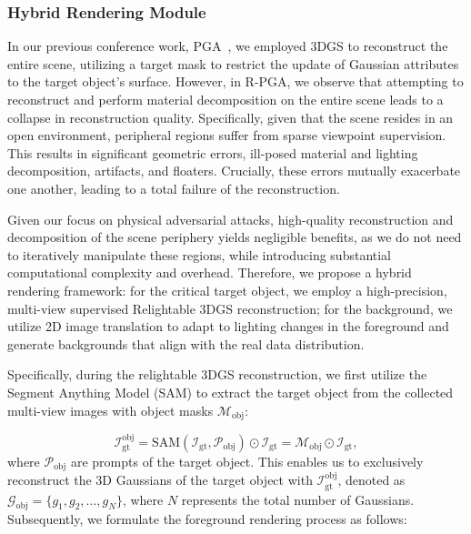 \documentclass[10pt,journal,compsoc]{IEEEtran}
\begin{document}
\subsubsection{Hybrid Rendering Module}
In our previous conference work, PGA~\cite{lou2025pga}, we employed 3DGS to reconstruct the entire scene, utilizing a target mask to restrict the update of Gaussian attributes to the target object's surface. 
However, in R-PGA, we observe that attempting to reconstruct and perform material decomposition on the entire scene leads to a collapse in reconstruction quality.
Specifically, given that the scene resides in an open environment, peripheral regions suffer from sparse viewpoint supervision. 
This results in significant geometric errors, ill-posed material and lighting decomposition, artifacts, and floaters. 
Crucially, these errors mutually exacerbate one another, leading to a total failure of the reconstruction.

Given our focus on physical adversarial attacks, high-quality reconstruction and decomposition of the scene periphery yields negligible benefits, as we do not need to iteratively manipulate these regions, while introducing substantial computational complexity and overhead.
Therefore, we propose a hybrid rendering framework: for the critical target object, we employ a high-precision, multi-view supervised Relightable 3DGS reconstruction; for the background, we utilize 2D image translation to adapt to lighting changes in the foreground and generate backgrounds that align with the real data distribution.

Specifically, during the relightable 3DGS reconstruction, we first utilize the Segment Anything Model (SAM) \cite{kirillov2023sam} to extract the target object from the collected multi-view images with object masks $\mathcal{M}_{\text{obj}}$: 

\begin{equation}
\mathcal{I}_{\text{gt}}^{\text{obj}} = \text{SAM}(\mathcal{I}_{\text{gt}}, \mathcal{P}_{\text{obj}}) \odot \mathcal{I}_{\text{gt}}=\mathcal{M}_{\text{obj}} \odot \mathcal{I}_{\text{gt}},
\label{eq:}
\end{equation}
where $\mathcal{P}_{\text{obj}}$ are prompts of the target object.
This enables us to exclusively reconstruct the 3D Gaussians of the target object with $\mathcal{I}_{\text{gt}}^{\text{obj}}$, denoted as $\mathcal{G}_{\text{obj}} = \{g_1, g_2, \dots, g_N\}$, where $N$ represents the total number of Gaussians.
Subsequently, we formulate the foreground rendering process as follows:
\end{document}
